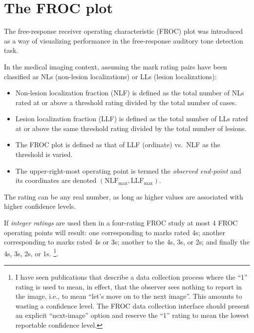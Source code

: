 \documentclass[
]{book}
\begin{document}
\hypertarget{froc-paradigm-froc-plot}{%
\section{The FROC plot}\label{froc-paradigm-froc-plot}}

The free-response receiver operating characteristic (FROC) plot was introduced \citep{RN2104} as a way of visualizing performance in the free-response auditory tone detection task.

In the medical imaging context, assuming the mark rating pairs have been classified as NLs (non-lesion localizations) or LLs (lesion localizations):

\begin{itemize}
\item
  Non-lesion localization fraction (NLF) is defined as the total number of NLs rated at or above a threshold rating divided by the total number of cases.
\item
  Lesion localization fraction (LLF) is defined as the total number of LLs rated at or above the same threshold rating divided by the total number of lesions.
\item
  The FROC plot is defined as that of LLF (ordinate) vs.~NLF as the threshold is varied.
\item
  The upper-right-most operating point is termed the \emph{observed end-point} and its coordinates are denoted \((\text{NLF}_{\text{max}}, \text{LLF}_{\text{max}})\).
\end{itemize}

The rating can be any real number, as long as higher values are associated with higher confidence levels.

If \emph{integer ratings} are used then in a four-rating FROC study at most 4 FROC operating points will result: one corresponding to marks rated 4s; another corresponding to marks rated 4s or 3s; another to the 4s, 3s, or 2s; and finally the 4s, 3s, 2s, or 1s. \footnote{I have seen publications that describe a data collection process where the ``1'' rating is used to mean, in effect, that the observer sees nothing to report in the image, i.e., to mean ``let's move on to the next image''. This amounts to wasting a confidence level. The FROC data collection interface should present an explicit ``next-image'' option and reserve the ``1'' rating to mean the lowest reportable confidence level.}.
\end{document}
